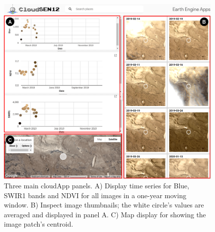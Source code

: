 \documentclass[a4paper, nobind]{templates/cdethesis}
\newcommand*{\bibtitle}{Bibliography}
\begin{document}
\begin{figure}[!h]
    \centering
    \includegraphics[width=1\linewidth]{figures/extra/figureS3.png}
    \caption{Three main cloudApp panels. A) Display time series for Blue, SWIR1 bands and NDVI for all images in a one-year moving window. B) Inspect image thumbnails; the white circle's values are averaged and displayed in panel A. C) Map display for showing the image patch's centroid.}
    \label{fig:figureS02}
\end{figure}


\setlength{\baselineskip}{0pt} %

{\renewcommand*\MakeUppercase[1]{#1}%
\printbibliography[heading=bibintoc,title={\bibtitle}]}
\end{document}
